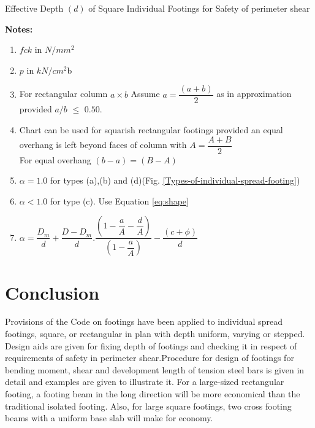 \documentclass{report}
\newcommand{\figmacro}[1] {Fig. #1}
\newcommand{\equmacro}[1] {Equation #1}
\begin{document}
\begin{chart}                                                             \begin{center}                                                     
\end{center}                                                       \caption{Effective Depth $(d)$ of Square Individual Footings for Safety of perimeter shear}  
\label{Dummy chart}    
\end{chart}    

\textbf{Notes:}
\begin{enumerate}
\item  $fck$ in $N/mm^2$
\item $p$ in $kN/cm^2$b
\item For rectangular column $a\times b$
Assume $a=\dfrac{(a+b)}{2}$ as in approximation provided $a/b$ $\leq$ $0.50.$
\item Chart can be used for squarish rectangular footings provided an equal overhang is left beyond faces of column with $A=\dfrac{A+B}{2}$\\
For equal overhang $(b-a)=(B-A)$
\item $\alpha=1.0$ for types (a),(b) and (d)(\figmacro \ref{Types-of-individual-spread-footing})
\item $\alpha<1.0$ for type (c). Use \equmacro \ref{eq:shape}
\item $\alpha=\dfrac{D_m}{d}+\dfrac{D-D_m}{d}.\dfrac{\left(1-\dfrac{a}{A}-\dfrac{d}{A}\right)}{\left(1-\dfrac{a}{A}\right)}-\dfrac{(c+\phi)}{d}$
\end{enumerate}

\section{Conclusion}
Provisions of the Code on footings have been applied to individual spread footings, square, or rectangular in plan with depth uniform, varying or stepped. Design aids are given for  fixing depth of footings and checking it in respect of requirements of safety in perimeter shear.Procedure for design of footings for bending moment, shear and development length of tension steel bars is given in detail and examples are given to illustrate it. For a large-sized rectangular footing, a footing beam in the long direction will be more economical than the traditional isolated footing. Also, for large square footings, two cross footing beams with a uniform base slab will make for economy.
\end{document}
